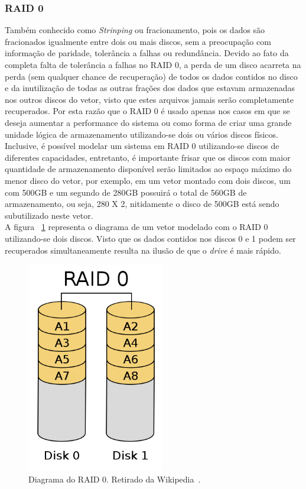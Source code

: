 		\subsubsection{RAID 0}
		
		Também conhecido como \textit{Strinping} ou fracionamento, pois os dados são fracionados igualmente entre dois ou mais discos, sem a preocupação com informação de paridade, tolerância a falhas ou redundância. Devido ao fato da completa falta de tolerância a falhas no RAID 0, a perda de um disco acarreta na perda (sem qualquer chance de recuperação) de todos os dados contidos no disco e da inutilização de todas as outras frações dos dados que estavam armazenadas nos outros discos do vetor, visto que estes arquivos jamais serão completamente recuperados. Por esta razão que o RAID 0 é usado apenas nos casos em que se deseja aumentar a performance do sistema ou como forma de criar uma grande unidade lógica de armazenamento utilizando-se dois ou vários discos físicos. Inclusive, é possível modelar um sistema em RAID 0 utilizando-se discos de diferentes capacidades, entretanto, é importante frisar que os discos com maior quantidade de armazenamento disponível serão limitados ao espaço máximo do menor disco do vetor, por exemplo, em um vetor montado com dois discos, um com 500GB e um segundo de 280GB possuirá o total de 560GB de armazenamento, ou seja, 280 X 2, nitidamente o disco de 500GB está sendo subutilizado neste vetor. \\
		
		A figura ~\ref{fig:raid0} representa o diagrama de um vetor modelado com o RAID 0 utilizando-se dois discos. Visto que os dados contidos nos discos 0 e 1 podem ser recuperados simultaneamente resulta na ilusão de que o \textit{drive} é mais rápido.\\
		
		\begin{figure}[htb]
			\begin{center}
				
				\includegraphics[clip,width=6.0cm]{images/RAID_0.png}
				\caption{Diagrama do RAID 0. Retirado da Wikipedia~\citep{wikiRAIDlevels}.}
				\label{fig:raid0}
			\end{center}
		\end{figure} 
		
